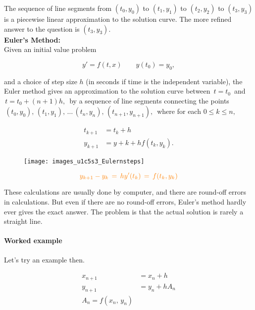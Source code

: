 The sequence of line segments from
$(t_0 , y_0)$ to $(t_1 , y_1)$ to $(t_2 , y_2)$ to $(t_3 , y_3)$ is
a piecewise linear approximation to the solution curve.
The more refined answer to the question is $(t_3 , y_3)$. \\

\textbf{Euler's Method:} \\
Given an initial value problem

\begin{equation*}
  y' = f(t, x) \qquad y(t_0) = y_0, 
\end{equation*}

and a choice of step size $h$ (in seconds if time is the independent variable),
the Euler method gives an approximation to the solution curve between
$\, t = t_0 \,$ and $\, t = t_0 + (n + 1)h , \,$ by a sequence of
line segments connecting the points
$ \,  (t_0,y_0),\, (t_1,y_1),\, \ldots \, (t_ n,y_ n), \, (t_{n+1},y_{n+1}),\,$
where for each $0\leq k\leq n,\,$

\begin{align*}
  t_{k+1} &= t_k + h \\
  y_{k+1} &= y+k + hf(t_k , y_k).
\end{align*}

\begin{figure}[ht!]
  \centering
  \texttt{[image: images\_u1c5s3\_Eulernsteps]}
\end{figure}

\begin{equation*}
  {\color{orange}{y_{k+1}-y_ k\, = \, h y'(t_ k)\, =\, f(t_ k,y_ k)}}
\end{equation*}

These calculations are usually done by computer, and there are round-off errors in calculations.
But even if there are no round-off errors, Euler's method hardly ever gives the exact answer.
The problem is that the actual solution is rarely a straight line.  \\

\paragraph{Worked example}
Let's try an example then.

\begin{align*}
  x_{n + 1} &= x_n + h \\
  y_{n+1} &= y_n + h A_n \\
  A_n = f(x_n , \, y_n)
\end{align*}

